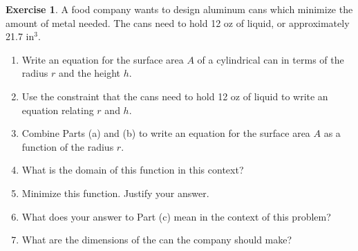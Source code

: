 \documentclass[11pt,reqno,final]{amsart}
\numberwithin{figure}{section}
\theoremstyle{definition} %
\newtheorem{exercise}[question]{Exercise}
\begin{document}
\begin{exercise}
        A food company wants to design aluminum cans which minimize the amount of metal needed.
        The cans need to hold 12 oz of liquid, or approximately 21.7 in$^3$.
        \begin{enumerate}
        \item Write an equation for the surface area $A$ of a cylindrical can in terms of the radius $r$ and the height $h$.
                \vfill
        \item Use the constraint that the cans need to hold 12 oz of liquid to write an equation relating $r$ and $h$.
                \vfill
        \item Combine Parts (a) and (b) to write an equation for the surface area $A$ as a function of the radius $r$.
                \vfill
                \vfill
        \item What is the domain of this function in this context?
                \vfill
                \newpage
        \item Minimize this function. Justify your answer.
                \vfill
                \vfill
                \vfill
        \item What does your answer to Part (c) mean in the context of this problem?
                \vfill
        \item What are the dimensions of the can the company should make?
                \vfill
        \end{enumerate}
\end{exercise}
\end{document}
